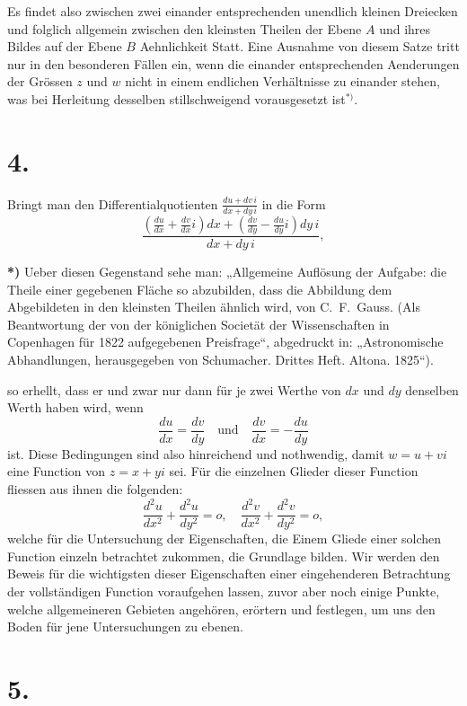 \documentclass{article}
\begin{document}
Es findet also zwischen zwei einander entsprechenden unendlich kleinen Dreiecken und folglich allgemein zwischen den kleinsten Theilen der Ebene $A$ und ihres Bildes auf der Ebene $B$ Aehnlichkeit Statt. Eine Ausnahme von diesem Satze tritt nur in den besonderen Fällen ein, wenn die einander entsprechenden Aenderungen der Grössen $z$ und $w$ nicht in einem endlichen Verhältnisse zu einander stehen, was bei Herleitung desselben stillschweigend vorausgesetzt ist${}^{*)}$.

\section*{4.}

Bringt man den Differentialquotienten $\frac{du + dv\,i}{dx + dy\,i}$ in die Form
\[
\frac{\left(\frac{du}{dx} + \frac{dv}{dx}i\right)dx + \left(\frac{dv}{dy} - \frac{du}{dy}i\right)dy\,i}{dx + dy\,i},
\]

\textbf{*)} Ueber diesen Gegenstand sehe man:
„Allgemeine Auflösung der Aufgabe: die Theile einer gegebenen Fläche so abzubilden, dass die Abbildung dem Abgebildeten in den kleinsten Theilen ähnlich wird, von C.~F.~Gauss. (Als Beantwortung der von der königlichen Societät der Wissenschaften in Copenhagen für 1822 aufgegebenen Preisfrage“, abgedruckt in: „Astronomische Abhandlungen, herausgegeben von Schumacher. Drittes Heft. Altona. 1825“).

so erhellt, dass er und zwar nur dann für je zwei Werthe von $dx$ und $dy$ denselben Werth haben wird, wenn
\[
\frac{du}{dx} = \frac{dv}{dy} \quad \text{und} \quad \frac{dv}{dx} = -\frac{du}{dy}
\]
ist. Diese Bedingungen sind also hinreichend und nothwendig, damit $w = u + vi$ eine Function von $z = x + yi$ sei. Für die einzelnen Glieder dieser Function fliessen aus ihnen die folgenden:
\[
\frac{d^2u}{dx^2} + \frac{d^2u}{dy^2} = o, \quad \frac{d^2v}{dx^2} + \frac{d^2v}{dy^2} = o,
\]
welche für die Untersuchung der Eigenschaften, die Einem Gliede einer solchen Function einzeln betrachtet zukommen, die Grundlage bilden. Wir werden den Beweis für die wichtigsten dieser Eigenschaften einer eingehenderen Betrachtung der vollständigen Function voraufgehen lassen, zuvor aber noch einige Punkte, welche allgemeineren Gebieten angehören, erörtern und festlegen, um uns den Boden für jene Untersuchungen zu ebenen.

\section*{5.}
\end{document}
